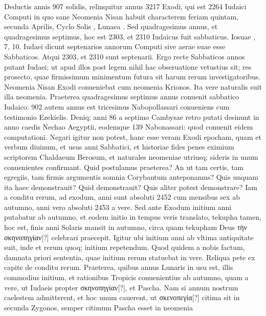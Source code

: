 Deductis annis 907 solidis, relinquitur annus 3217
Exodi, qui est 2264 Iudaici Computi in quo sane Neomenia Nisan
habuit characterem feriam quintam, secunda Aprilis, Cyclo
Solis , Lunaea .
Sed quadragesimus annus, et quadragesimus
septimus, hoc est 2303, et 2310 Iudaicus fuit sabbaticus.
Iosuae
, 7, 10.
Iudaei dicunt septenarios annorum Computi sive aerae
suae esse Sabbaticos.
Atqui 2303, et 2310 sunt septenarii.
Ergo recte
Sabbaticos annos putant Iudaei; ut apud illos post legem nihil
hac obseruatione vetustius sit; res prosecto, quae firmissimum
minimentum futura sit harum rerum investigatoribus.
Neomenia Nisan Exodi conueniebat cum neomenia Krionos.
Ita vere naturalis suit illa neomenia.
Praeterea quadragesimus septimus
annus conuenit sabbatico Iudaico: 902 autem annus est tricesimus
Nabopollassari conueniens cum testimonio Ezekielis.
Deniq; anni 86 a septimo Cambysae retro putati desinunt in anno
caedis Nechao Aegyptii, eodemque 139 Nabonassari: quod conuenit
eidem computationi.
Negari igitur non potest, hanc esse veram
Exodi epocham, quam et verbum diuinum, et usus anni Sabbatici,
et historiae fides penes eximium scriptorem Chaldaeum
Berosum, et naturales neomeniae utriusq; sideris in unum conuenientes
confirmant.
Quid postulamus praeterea?
An ut tam certis,
tam egregiis, tam firmis argumentis somnia Corybantum anteponamus?
Quis unquam ita haec demonstrauit?
Quid demonstrauit?
%
Quis aliter potest demonstrare?
Iam a conditu rerum, ad exodum,
anni sunt absoluti 2452 cum mensibus sex ab autumno, anni vero
absoluti 2453 a vere.
Sed ante Exodum initium anni putabatur ab
autumno, et eodem initio in tempus veris translato, tekupha tamen,
hoc est, finis anni Solaris mansit in autumno, circa quam tekupham
Deus \textgreek{τὴν σκηνοπηγίαν[?]} celebrari praecepit.
Igitur ubi initium anni
ab vltima antiquitate suit, inde et rerum quoq; initium repetendum.
Quod quidem a nobis factum, damnata priori sententia, quae
initium rerum statuebat in vere.
Reliqua pete ex capite de conditu
rerum.
Praeterea, quibus annus Lunaris in usu est, illis commodius
initium, et rationibus Tropicis conuenientius ab autumno, quam
a vere, ut Iudaeis propter \textgreek{σκηνοπηγίαν[?]}, et Pascha.
Nam si annum
nostrum caelestem admitterent, et hoc unum cauerent, ut \textgreek{σκενοπεγία[?]}
citima sit in secunda Zygonos, semper citimum Pascha esset in neomenia
